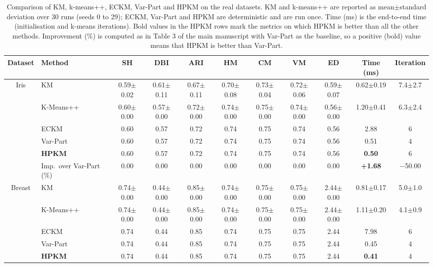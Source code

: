 \begin{table}[p]
\centering
\caption{Comparison of KM, k-means++, ECKM, Var-Part and HPKM on the real datasets. KM and k-means++ are reported as mean$\pm$standard deviation over 30 runs (seeds 0 to 29); ECKM, Var-Part and HPKM are deterministic and are run once. Time (ms) is the end-to-end time (initialisation and k-means iterations). Bold values in the HPKM rows mark the metrics on which HPKM is better than all the other methods. Improvement (\%) is computed as in Table 3 of the main manuscript with Var-Part as the baseline, so a positive (bold) value means that HPKM is better than Var-Part.}
\label{tab:S2}
\scriptsize
\setlength{\tabcolsep}{3pt}
\begin{adjustbox}{max width=\textwidth, max totalheight=0.85\textheight}
\begin{tabular}{|c|l|ccccccccc|}
\hline
Dataset & Method & SH & DBI & ARI & HM & CM & VM & ED & Time (ms) & Iteration \\
\hline
Iris & KM & 0.59$\pm$0.02 & 0.61$\pm$0.11 & 0.67$\pm$0.11 & 0.70$\pm$0.08 & 0.73$\pm$0.04 & 0.72$\pm$0.06 & 0.59$\pm$0.07 & 0.62$\pm$0.19 & 7.4$\pm$2.7 \\
 & K-Means++ & 0.60$\pm$0.00 & 0.57$\pm$0.00 & 0.72$\pm$0.00 & 0.74$\pm$0.00 & 0.75$\pm$0.00 & 0.74$\pm$0.00 & 0.56$\pm$0.00 & 1.20$\pm$0.41 & 6.3$\pm$2.4 \\
 & ECKM & 0.60 & 0.57 & 0.72 & 0.74 & 0.75 & 0.74 & 0.56 & 2.88 & 6 \\
 & Var-Part & 0.60 & 0.57 & 0.72 & 0.74 & 0.75 & 0.74 & 0.56 & 0.51 & 4 \\
 & \textbf{HPKM} & 0.60 & 0.57 & 0.72 & 0.74 & 0.75 & 0.74 & 0.56 & \textbf{0.50} & 6 \\
& Imp.\ over Var-Part (\%) & 0.00 & 0.00 & 0.00 & 0.00 & 0.00 & 0.00 & 0.00 & \textbf{+1.68} & $-$50.00 \\
\hline
Breast & KM & 0.74$\pm$0.00 & 0.44$\pm$0.00 & 0.85$\pm$0.00 & 0.74$\pm$0.00 & 0.75$\pm$0.00 & 0.75$\pm$0.00 & 2.44$\pm$0.00 & 0.81$\pm$0.17 & 5.0$\pm$1.0 \\
 & K-Means++ & 0.74$\pm$0.00 & 0.44$\pm$0.00 & 0.85$\pm$0.00 & 0.74$\pm$0.00 & 0.75$\pm$0.00 & 0.75$\pm$0.00 & 2.44$\pm$0.00 & 1.11$\pm$0.20 & 4.1$\pm$0.9 \\
 & ECKM & 0.74 & 0.44 & 0.85 & 0.74 & 0.75 & 0.75 & 2.44 & 7.98 & 6 \\
 & Var-Part & 0.74 & 0.44 & 0.85 & 0.74 & 0.75 & 0.75 & 2.44 & 0.45 & 4 \\
 & \textbf{HPKM} & 0.74 & 0.44 & 0.85 & 0.74 & 0.75 & 0.75 & 2.44 & \textbf{0.41} & 4 \\

\end{tabular}
\end{adjustbox}
\end{table}
